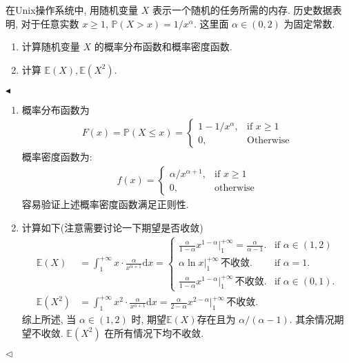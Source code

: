 \documentclass[11pt]{article}
\newenvironment{problem}[2][Problem]{\begin{trivlist}
    \item[\hskip \labelsep {\bfseries #1}\hskip \labelsep {\bfseries #2.}]\songti}{\hfill$\blacktriangleleft$\end{trivlist}}
\newenvironment{answer}[1][Solution]{\begin{trivlist}
    \item[\hskip \labelsep {\bfseries #1.}\hskip \labelsep]}{\hfill$\lhd$\end{trivlist}}
\newcommand\1{\mathds{1}}
\newcommand\E{\mathbb{E}}
\newcommand\PP{\mathbb{P}}
\newcommand\dd{\mathrm{d}}
\begin{document}
\begin{problem}{2}
    在Unix操作系统中, 用随机变量 $X$ 表示一个随机的任务所需的内存. 历史数据表明, 对于任意实数 $x\ge 1$, $\PP(X>x) = 1/x^{\alpha}$. 这里面 $\alpha \in (0,2)$ 为固定常数.
    \begin{enumerate}[label=(\arabic*)]
        \item 计算随机变量 $X$ 的概率分布函数和概率密度函数.
        \item 计算 $\E(X), \E(X^2)$.
    \end{enumerate}
\end{problem}
\begin{answer}
    \begin{enumerate}[label = (\arabic*)]
        \item 概率分布函数为
        \begin{align*}
            F(x) = \PP(X\le x) = \begin{cases}
                1 - 1/x^\alpha, &\text{if } x \ge 1 \\
                0, &\text{Otherwise}
            \end{cases}
        \end{align*}
        概率密度函数为:
        \begin{align*}
            f(x) = \begin{cases}
                \alpha / x^{\alpha + 1}, &\text{if } x \ge 1 \\
                0, &\text{otherwise}
            \end{cases}
        \end{align*}
        容易验证上述概率密度函数满足正则性.
        \item 计算如下(注意需要讨论一下期望是否收敛) \begin{align*}
            \E(X) &= \int_{1}^{+\infty} x\cdot \frac{\alpha}{x^{\alpha+1}}\dd x =\begin{cases}
                \frac{\alpha}{1-\alpha} x^{1-\alpha} |_{1}^{+\infty} = \frac{\alpha}{\alpha-1}. &\text{if } \alpha \in (1,2)\\
                \alpha\ln x |_{1}^{+\infty}\, \text{不收敛}. &\text{if } \alpha = 1. \\
                \frac{\alpha}{1-\alpha} x^{1-\alpha} |_{1}^{+\infty}\, \text{不收敛}. &\text{if } \alpha \in (0,1).  
            \end{cases} \\
            \E(X^2) &= \int_{1}^{+\infty} x^2\cdot \frac{\alpha}{x^{\alpha + 1}} \dd x = \frac{\alpha}{2-\alpha} x^{2-\alpha} \bigg|_{1}^{+\infty} \, \text{不收敛}.
        \end{align*}
        综上所述, 当 $\alpha \in (1,2)$ 时, 期望$\E(X)$存在且为 $\alpha/(\alpha-1)$. 其余情况期望不收敛. $\E(X^2)$ 在所有情况下均不收敛.
    \end{enumerate}
\end{answer}
\end{document}
